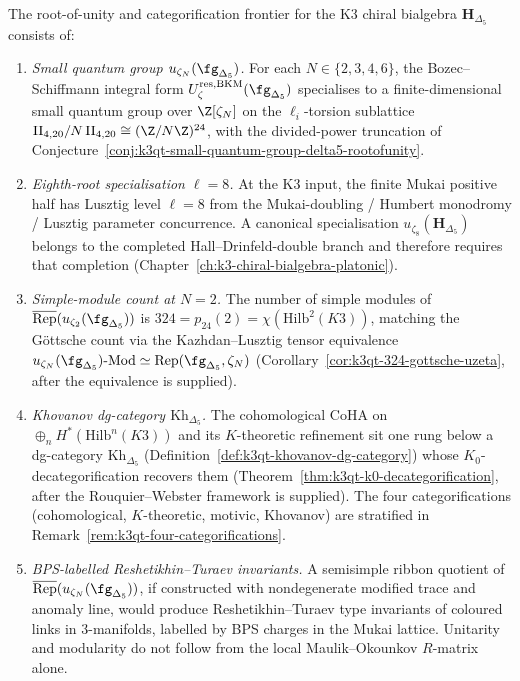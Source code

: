 \begin{conjecture}
\label{conj:root-unity-categorification-frontier}
\ClaimStatusConjectured
The root-of-unity and categorification frontier for the K3 chiral bialgebra $\mathbf H_{\Delta_5}$ consists of:
\begin{enumerate}[label=\textup{(U\arabic*)}]
 \item \emph{Small quantum group $u_{\zeta_N}(\fg_{\Delta_5})$.} For each $N \in \{2, 3, 4, 6\}$, the Bozec--Schiffmann integral form $U^{\mathrm{res}, \mathrm{BKM}}_\zeta(\fg_{\Delta_5})$ specialises to a finite-dimensional small quantum group over $\Z[\zeta_N]$ on the $\ell_i$-torsion sublattice $\mathrm{II}_{4, 20}/N\,\mathrm{II}_{4, 20} \cong (\Z/N\Z)^{24}$, with the divided-power truncation of Conjecture~\ref{conj:k3qt-small-quantum-group-delta5-rootofunity}.
 \item \emph{Eighth-root specialisation $\ell = 8$.} At the K3 input, the finite Mukai positive half has Lusztig level $\ell = 8$ from the Mukai-doubling / Humbert monodromy / Lusztig parameter concurrence. A canonical specialisation $u_{\zeta_8}(\mathbf H_{\Delta_5})$ belongs to the completed Hall--Drinfeld-double branch and therefore requires that completion (Chapter~\ref{ch:k3-chiral-bialgebra-platonic}).
 \item \emph{Simple-module count at $N = 2$.} The number of simple modules of $\overline{\mathrm{Rep}}(u_{\zeta_2}(\fg_{\Delta_5}))$ is $324 = p_{24}(2) = \chi(\mathrm{Hilb}^2(K3))$, matching the G\"ottsche count via the Kazhdan--Lusztig tensor equivalence $u_{\zeta_N}(\fg_{\Delta_5})\text{-}\mathrm{Mod} \simeq \mathrm{Rep}(\fg_{\Delta_5}, \zeta_N)$ (Corollary~\ref{cor:k3qt-324-gottsche-uzeta}, after the equivalence is supplied).
 \item \emph{Khovanov dg-category $\mathrm{Kh}_{\Delta_5}$.} The cohomological CoHA on $\oplus_n H^*(\mathrm{Hilb}^n(K3))$ and its $K$-theoretic refinement sit one rung below a dg-category $\mathrm{Kh}_{\Delta_5}$ (Definition~\ref{def:k3qt-khovanov-dg-category}) whose $K_0$-decategorification recovers them (Theorem~\ref{thm:k3qt-k0-decategorification}, after the Rouquier--Webster framework is supplied). The four categorifications (cohomological, $K$-theoretic, motivic, Khovanov) are stratified in Remark~\ref{rem:k3qt-four-categorifications}.
 \item \emph{BPS-labelled Reshetikhin--Turaev invariants.} A semisimple ribbon quotient of $\overline{\mathrm{Rep}}(u_{\zeta_N}(\fg_{\Delta_5}))$, if constructed with nondegenerate modified trace and anomaly line, would produce Reshetikhin--Turaev type invariants of coloured links in $3$-manifolds, labelled by BPS charges in the Mukai lattice. Unitarity and modularity do not follow from the local Maulik--Okounkov $R$-matrix alone.

\end{enumerate}
\end{conjecture}
